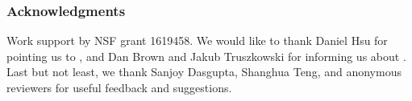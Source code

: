 
\subsubsection*{Acknowledgments}
Work support by NSF grant 1619458.
We would like to thank Daniel Hsu
for pointing us to \cite{pearl-tarsi:1986:strucuting},
and Dan Brown and Jakub Truszkowski
for informing us about
\cite{brown-truszkowski:2011:phylogeny-quartet,
brown-truszkowski:2011:phylogeny-quartet-practical}.
Last but not least, we thank Sanjoy Dasgupta,
Shanghua Teng, and anonymous reviewers
for useful feedback and suggestions. 
